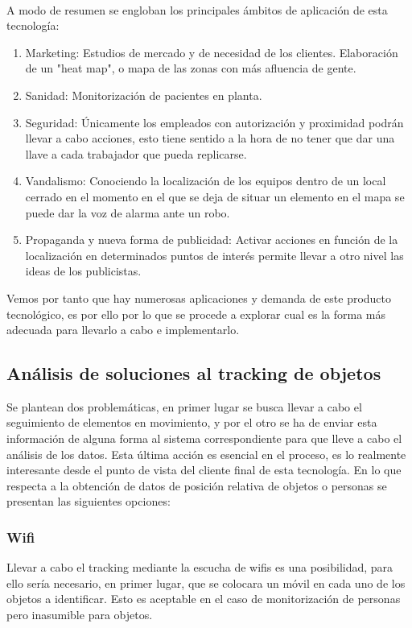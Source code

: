 \documentclass[a4paper ,12pt, onecolumn]{article}
\begin{document}
        \paragraph{}
        A modo de resumen se engloban los principales ámbitos de aplicación de esta tecnología:
        \begin{enumerate}
            \item Marketing: Estudios de mercado y de necesidad de los clientes. Elaboración de un "heat map", o mapa 
            de las zonas con más afluencia de gente.
            \item Sanidad: Monitorización de pacientes en planta. 
            \item Seguridad: Únicamente los empleados con autorización y proximidad podrán llevar a cabo acciones,
            esto tiene sentido a la hora de no tener que dar una llave a cada trabajador que pueda replicarse.
            \item Vandalismo: Conociendo la localización de los equipos dentro de un local cerrado en el momento 
            en el que se deja de situar un elemento en el mapa se puede dar la voz de alarma ante un robo.
            \item Propaganda y nueva forma de publicidad: Activar acciones en función de la localización en determinados
            puntos de interés permite llevar a otro nivel las ideas de los publicistas.
        \end{enumerate}
        Vemos por tanto que hay numerosas aplicaciones y demanda de este producto tecnológico, es por ello por lo que se 
        procede a explorar cual es la forma más adecuada para llevarlo a cabo e implementarlo.
    \subsection{Análisis de soluciones al tracking de objetos}
        Se plantean dos problemáticas, en primer lugar se busca llevar a cabo el seguimiento de elementos en movimiento, y por el otro 
        se ha de enviar esta información de alguna forma al sistema correspondiente para que lleve a cabo el análisis de los datos. Esta
        última acción es esencial en el proceso, es lo realmente interesante desde el punto de vista del cliente final de esta tecnología.
        En lo que respecta a la obtención de datos de posición relativa de objetos o personas se presentan las siguientes opciones:
        \subsubsection {Wifi}
            Llevar a cabo el tracking mediante la escucha de wifis es una posibilidad, para ello sería
            necesario, en primer lugar, que se colocara un móvil en cada uno de los objetos a identificar. Esto es aceptable 
            en el caso de monitorización de personas pero inasumible para objetos.
\end{document}
